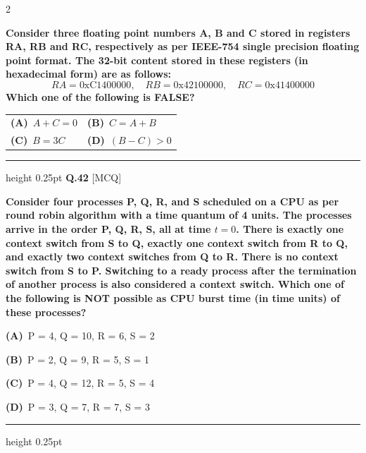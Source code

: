 \documentclass[a4paper,10pt,twoside]{article}
\begin{document}
\begin{multicols}{2}
\par\vspace{2pt}
{\bfseries Consider three floating point numbers A, B and C stored in registers RA, RB and RC, respectively as per IEEE-754 single precision floating point format. The 32-bit content stored in these registers (in hexadecimal form) are as follows:
\[ RA = \text{0xC1400000}, \quad RB = \text{0x42100000}, \quad RC = \text{0x41400000} \]
Which one of the following is FALSE? \par}
\par\vspace{2pt}\noindent
\begin{tabular*}{\columnwidth}{@{\extracolsep{\fill}}p{}p{}@{}}
\textbf{(A)}~$A + C = 0$ & \textbf{(B)}~$C = A + B$ \\
\addlinespace[2pt]
\textbf{(C)}~$B = 3C$ & \textbf{(D)}~$(B - C) > 0$
\end{tabular*}
\par\vspace{6pt}\hrule height 0.25pt\vspace{6pt}
\noindent\textbf{Q.42} \hfill {\footnotesize\textsf{[MCQ]}}
\par\vspace{2pt}
{\bfseries Consider four processes P, Q, R, and S scheduled on a CPU as per round robin algorithm with a time quantum of 4 units. The processes arrive in the order P, Q, R, S, all at time $t = 0$. There is exactly one context switch from S to Q, exactly one context switch from R to Q, and exactly two context switches from Q to R. There is no context switch from S to P. Switching to a ready process after the termination of another process is also considered a context switch. Which one of the following is NOT possible as CPU burst time (in time units) of these processes? \par}
\par\vspace{2pt}\noindent
\textbf{(A)}~P = 4, Q = 10, R = 6, S = 2\par\vspace{2pt}\noindent
\textbf{(B)}~P = 2, Q = 9, R = 5, S = 1\par\vspace{2pt}\noindent
\textbf{(C)}~P = 4, Q = 12, R = 5, S = 4\par\vspace{2pt}\noindent
\textbf{(D)}~P = 3, Q = 7, R = 7, S = 3
\par\vspace{6pt}\hrule height 0.25pt\vspace{6pt}

\end{multicols}
\end{document}
